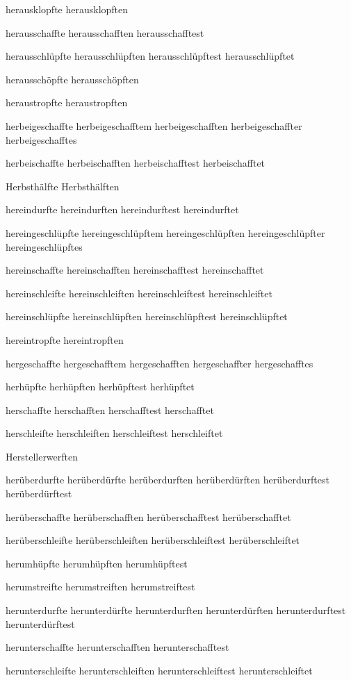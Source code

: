 herausklopfte
herausklopften

herausschaffte
herausschafften
herausschafftest

herausschlüpfte
herausschlüpften
herausschlüpftest
herausschlüpftet

herausschöpfte
herausschöpften

heraustropfte
heraustropften

herbeigeschaffte
herbeigeschafftem
herbeigeschafften
herbeigeschaffter
herbeigeschafftes

herbeischaffte
herbeischafften
herbeischafftest
herbeischafftet

Herbsthälfte
Herbsthälften

hereindurfte
hereindurften
hereindurftest
hereindurftet

hereingeschlüpfte
hereingeschlüpftem
hereingeschlüpften
hereingeschlüpfter
hereingeschlüpftes

hereinschaffte
hereinschafften
hereinschafftest
hereinschafftet

hereinschleifte
hereinschleiften
hereinschleiftest
hereinschleiftet

hereinschlüpfte
hereinschlüpften
hereinschlüpftest
hereinschlüpftet

hereintropfte
hereintropften

hergeschaffte
hergeschafftem
hergeschafften
hergeschaffter
hergeschafftes

herhüpfte
herhüpften
herhüpftest
herhüpftet

herschaffte
herschafften
herschafftest
herschafftet

herschleifte
herschleiften
herschleiftest
herschleiftet

Herstellerwerften

herüberdurfte
herüberdürfte
herüberdurften
herüberdürften
herüberdurftest
herüberdürftest

herüberschaffte
herüberschafften
herüberschafftest
herüberschafftet

herüberschleifte
herüberschleiften
herüberschleiftest
herüberschleiftet

herumhüpfte
herumhüpften
herumhüpftest

herumstreifte
herumstreiften
herumstreiftest

herunterdurfte
herunterdürfte
herunterdurften
herunterdürften
herunterdurftest
herunterdürftest

herunterschaffte
herunterschafften
herunterschafftest

herunterschleifte
herunterschleiften
herunterschleiftest
herunterschleiftet

